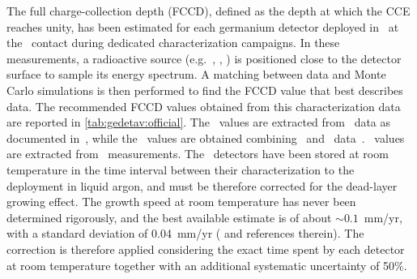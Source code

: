 The full charge-collection depth (FCCD), defined as the depth at which the CCE reaches
unity, has been estimated for each germanium detector deployed in \gerda\ at the \nplus\
contact during dedicated characterization campaigns. In these measurements, a radioactive
source (e.g.~\Am, \Ba, \Co) is positioned close to the detector surface to sample its
energy spectrum. A matching between data and Monte Carlo simulations is then performed to
find the FCCD value that best describes data. The recommended FCCD values obtained from
this characterization data are reported in \cref{tab:gedetav:official}. The \scoax\ values
are extracted from \Co\ data as documented in~\cite{Heider2009}, while the \bege\ values
are obtained combining \Am\ and \Ba\ data~\cite{Agostini2019}. \icoax\ values are
extracted from \Am\ measurements. The \bege\ detectors have been stored at room
temperature in the time interval between their characterization to the deployment in
liquid argon, and must be therefore corrected for the dead-layer growing effect. The
growth speed at room temperature has never been determined rigorously, and the best
available estimate is of about $\sim{}0.1$~mm/yr, with a standard deviation of 0.04~mm/yr
(\cite{Agostini2019} and references therein). The correction is therefore applied
considering the exact time spent by each detector at room temperature together with an
additional systematic uncertainty of 50\%.
\begin{table}
  \centering
  \caption{%
    Recommended full charge-collection depth (FCCD) and dead layer fraction (DLF) values
    for each detector deployed in \gerdatwo, calculated from detector characterization
    data. The \bege\ FCCD values are obtained combining \Am\ and \Ba\
    data~\cite{Agostini2019} while \scoax\ values are extracted from \Co\
    data~\cite{Heider2009}. The \icoax\ values are obtained from \Am\ data. The \bege\
    FCCDs are corrected for the dead-layer growing effect at room temperature experienced
    before installment in \gerda~\cite{Agostini2019}. The uncertainties are split into
    correlated and uncorrelated contributions. The DLF values have been estimated
    in~\cite{Lehnert2016} and do not include any growing effect at room temperature.
    \fillme{fill table}
  }\label{tab:gedetav:official}
  
\end{table}

